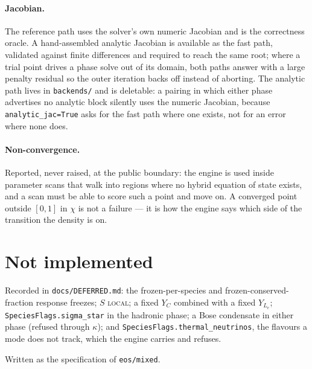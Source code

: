 \documentclass[aps,prc,onecolumn,superscriptaddress,nofootinbib,10pt]{revtex4-2}
\begin{document}
\paragraph{Jacobian.} The reference path uses the solver's own numeric
Jacobian and is the correctness oracle. A hand-assembled analytic Jacobian is
available as the fast path, validated against finite differences and required
to reach the same root; where a trial point drives a phase solve out of its
domain, both paths answer with a large penalty residual so the outer iteration
backs off instead of aborting. The analytic path lives in \texttt{backends/}
and is deletable: a pairing in which either phase advertises no analytic block
silently uses the numeric Jacobian, because \texttt{analytic\_jac=True} asks
for the fast path where one exists, not for an error where none does.

\paragraph{Non-convergence.} Reported, never raised, at the public boundary:
the engine is used inside parameter scans that walk into regions where no
hybrid equation of state exists, and a scan must be able to score such a point
and move on. A converged point outside $[0,1]$ in $\chi$ is not a failure ---
it is how the engine says which side of the transition the density is on.

\section{Not implemented}

Recorded in \texttt{docs/DEFERRED.md}: the frozen-per-species and
frozen-conserved-fraction response freezes; $S$ \textsc{local}; a fixed $Y_C$
combined with a fixed $Y_{L_e}$; \texttt{SpeciesFlags.sigma\_star} in the
hadronic phase; a Bose condensate in either phase (refused through $\kappa$);
and \texttt{SpeciesFlags.thermal\_neutrinos}, the flavours a mode does not
track, which the engine carries and refuses.

\begin{acknowledgments}
Written as the specification of \texttt{eos/mixed}.
\end{acknowledgments}


\end{document}
